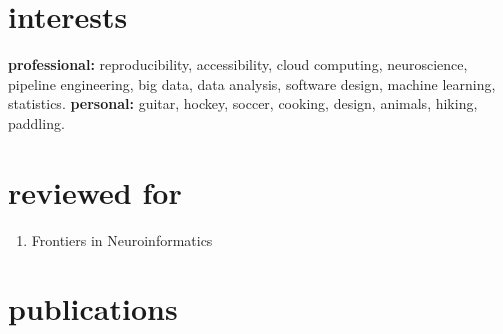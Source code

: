 \documentclass[]{friggeri-cv} %
\begin{document}

\section{interests}

\textbf{professional:} reproducibility, accessibility, cloud computing, neuroscience, pipeline engineering, big data,
data analysis, software design, machine learning, statistics.
\textbf{personal:} guitar, hockey, soccer, cooking, design, animals, hiking, paddling.

\section{reviewed for}
\begin{enumerate}
\item Frontiers in Neuroinformatics
\end{enumerate}


\section{publications}







\end{document}
